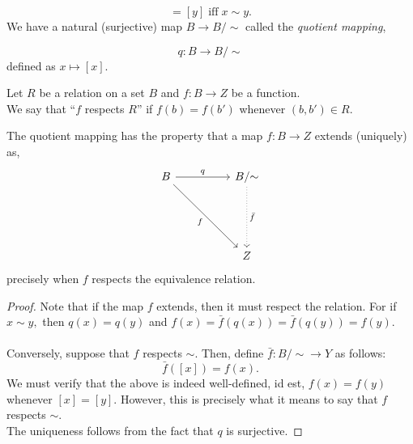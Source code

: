 \begin{equation*} 
	[x] = [y] \; \text{iff} \; x \sim y.
\end{equation*}
We have a natural (surjective) map $B \to B/{\sim}$ called the \emph{quotient mapping},

\begin{equation*} 
	q:B \to B/{\sim}
\end{equation*}
defined as $x \mapsto [x].$ 

\begin{defn} 
	Let $R$ be a relation on a set $B$ and $f:B\to Z$ be a function.\\
	We say that ``$f$ respects $R$'' if $f(b) = f(b')$ whenever $(b, b') \in R.$
\end{defn}

\begin{prop} \label{prop:fextend}
The quotient mapping has the property that a map $f:B\to Z$ extends (uniquely) as,
\begin{equation*} 
	\begin{tikzcd}
		B \arrow[rr, "q"] \arrow[rrddd, "f"'] && B/{\sim} \arrow[ddd, "\bar{f}" ,dotted]\\
		&&\\&&\\
		&& Z
	\end{tikzcd}
\end{equation*}
precisely when $f$ respects the equivalence relation.
\end{prop}
\begin{proof} 
	Note that if the map $f$ extends, then it must respect the relation. For if $x \sim y,$ then $q(x) = q(y)$ and $f(x) = \bar{f}(q(x)) = \bar{f}(q(y)) = f(y).$\\~\\
	Conversely, suppose that $f$ respects $\sim.$ Then, define $\bar{f}:B/{\sim} \to Y$ as follows:
	\begin{equation*} 
		\bar{f}([x]) = f(x).
	\end{equation*}
	We must verify that the above is indeed well-defined, id est, $f(x) = f(y)$ whenever $[x] = [y].$ However, this is precisely what it means to say that $f$ respects $\sim.$\\
	The uniqueness follows from the fact that $q$ is surjective.
\end{proof}


